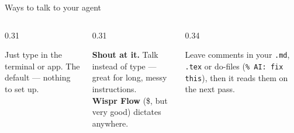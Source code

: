 \documentclass[aspectratio=169, 10pt]{beamer}
\begin{document}


\begin{frame}{Ways to talk to your agent}
\vskip6pt
\begin{columns}[T]
\begin{column}{0.31\textwidth}
\begin{tcolorbox}[keybox, title={\faKeyboard\quad 1. Type}, top=3pt, bottom=3pt]
\small Just type in the terminal or app. The default --- nothing to set up.
\end{tcolorbox}
\end{column}
\begin{column}{0.31\textwidth}
\begin{tcolorbox}[keybox, title={\faMicrophone\quad 2. Dictate}, top=3pt, bottom=3pt]
\small \textbf{Shout at it.} Talk instead of type --- great for long, messy instructions. \\

 \textbf{Wispr Flow} (\$, but very good) dictates anywhere.
\end{tcolorbox}
\end{column}
\begin{column}{0.34\textwidth}
\begin{tcolorbox}[keybox, title={\faStickyNote\quad 3. Notes in your files}, top=3pt, bottom=3pt]
\small Leave comments in your \texttt{.md}, \texttt{.tex} or do-files (\texttt{\% AI: fix this}), then it reads them on the next pass.
\end{tcolorbox}
\end{column}
\end{columns}
\end{frame}
\end{document}
